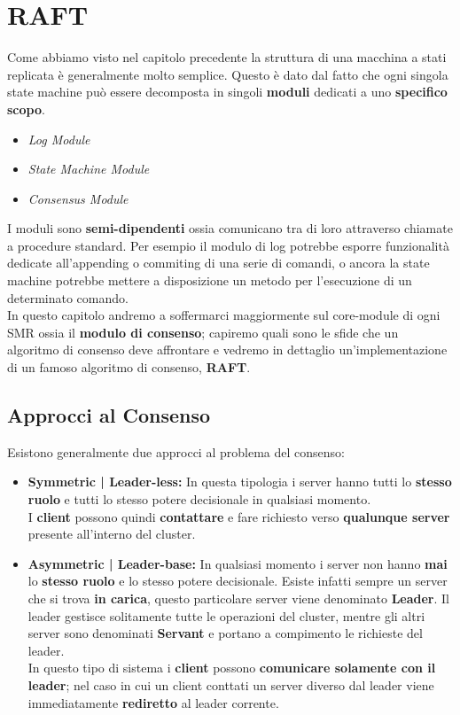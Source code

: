 \chapter{RAFT}
	Come abbiamo visto nel capitolo precedente la struttura di una macchina a stati replicata è generalmente molto semplice. Questo è dato dal fatto che ogni singola state machine può essere decomposta in singoli \textbf{moduli} dedicati a uno \textbf{specifico scopo}.
	\begin{itemize}
		\item{\textit{Log Module}}
		\item{\textit{State Machine Module}}
		\item{\textit{Consensus Module}}
	\end{itemize}
	I moduli sono \textbf{semi-dipendenti} ossia comunicano tra di loro attraverso chiamate a procedure standard. Per esempio il modulo di log potrebbe esporre funzionalità dedicate all'appending o commiting di una serie di comandi, o ancora la state machine potrebbe mettere a disposizione un metodo per l'esecuzione di un determinato comando.\\
	In questo capitolo andremo a soffermarci maggiormente sul core-module di ogni SMR ossia il \textbf{modulo di consenso}; capiremo quali sono le sfide che un algoritmo di consenso deve affrontare e vedremo in dettaglio un'implementazione di un famoso algoritmo di consenso, \textbf{RAFT}.
	
	\section{Approcci al Consenso}
	Esistono generalmente due approcci al problema del consenso:
	\begin{itemize}
		\item{\textbf{Symmetric | Leader-less:}}
		In questa tipologia i server hanno tutti lo \textbf{stesso ruolo} e tutti lo stesso potere decisionale in qualsiasi momento.\\
		I \textbf{client} possono quindi \textbf{contattare} e fare richiesto verso \textbf{qualunque server} presente all'interno del cluster. 
		\item{\textbf{Asymmetric | Leader-base:}}
		In qualsiasi momento i server non hanno \textbf{mai} lo \textbf{stesso ruolo} e lo stesso potere decisionale. Esiste infatti sempre un server che si trova \textbf{in carica}, questo particolare server viene denominato \textbf{Leader}. Il leader gestisce solitamente tutte le operazioni del cluster, mentre gli altri server sono denominati \textbf{Servant} e portano a compimento le richieste del leader.\\
		In questo tipo di sistema i \textbf{client} possono \textbf{comunicare solamente con il leader}; nel caso in cui un client conttati un server diverso dal leader viene immediatamente \textbf{rediretto} al leader corrente.
	\end{itemize}
